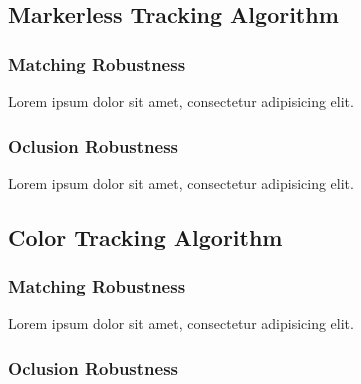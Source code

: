 

\subsection{Markerless Tracking Algorithm} %
\label{sec:evaluation:results:markerless_tracking_algorithm}

\subsubsection{Matching Robustness} %
\label{subsub:evaluation:results:markerless_tracking_algorithm:matching_robustness}

Lorem ipsum dolor sit amet, consectetur adipisicing elit.


\subsubsection{Oclusion Robustness} %
\label{subsub:evaluation:results:markerless_tracking_algorithm:occlusion_robustness}

Lorem ipsum dolor sit amet, consectetur adipisicing elit.



\subsection{Color Tracking Algorithm} %
\label{sec:evaluation:results:color_tracking_algorithm}

\subsubsection{Matching Robustness} %
\label{subsub:evaluation:results:color_tracking_algorithm:matching_robustness}

Lorem ipsum dolor sit amet, consectetur adipisicing elit.


\subsubsection{Oclusion Robustness} %
\label{subsub:evaluation:results:color_tracking_algorithm:occlusion_robustness}

